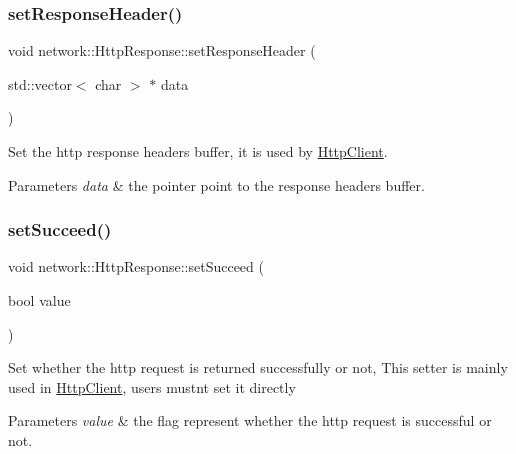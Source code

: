 \subsubsection{\texorpdfstring{set\+Response\+Header()}{setResponseHeader()}\hspace{0.1cm}{\footnotesize\ttfamily [2/2]}}
{\footnotesize\ttfamily void network\+::\+Http\+Response\+::set\+Response\+Header (\begin{DoxyParamCaption}\item[{std\+::vector$<$ char $>$ $\ast$}]{data }\end{DoxyParamCaption})\hspace{0.3cm}{\ttfamily [inline]}}

Set the http response headers buffer, it is used by \hyperlink{classnetwork_1_1HttpClient}{Http\+Client}. 
\begin{DoxyParams}{Parameters}
{\em data} & the pointer point to the response headers buffer. \\
\hline
\end{DoxyParams}
\mbox{\label{classnetwork_1_1HttpResponse_ad553ec4853bd1bd0b1cecd52f541e0bb}} 
\subsubsection{\texorpdfstring{set\+Succeed()}{setSucceed()}\hspace{0.1cm}{\footnotesize\ttfamily [1/2]}}
{\footnotesize\ttfamily void network\+::\+Http\+Response\+::set\+Succeed (\begin{DoxyParamCaption}\item[{bool}]{value }\end{DoxyParamCaption})\hspace{0.3cm}{\ttfamily [inline]}}

Set whether the http request is returned successfully or not, This setter is mainly used in \hyperlink{classnetwork_1_1HttpClient}{Http\+Client}, users mustn\textquotesingle{}t set it directly 
\begin{DoxyParams}{Parameters}
{\em value} & the flag represent whether the http request is successful or not. \\
\hline
\end{DoxyParams}
\mbox{\label{classnetwork_1_1HttpResponse_ad553ec4853bd1bd0b1cecd52f541e0bb}} 

